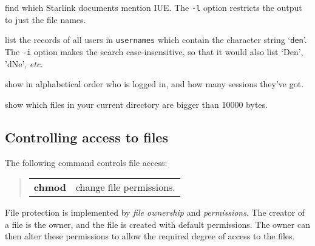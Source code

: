 {find which Starlink documents mention IUE.
The {\tt -l} option restricts the output to just the file names.}

{list the records of all users in {\tt usernames} which contain the character
string `{\tt den}'.
The {\tt -i} option makes the search case-insensitive, so that it would also
list `Den', 'dNe', {\em etc.}}

{show in alphabetical order who is logged in, and how many sessions they've
got.}

{show which files in your current directory are bigger than 10000 bytes.}

\exend

\subsection{Controlling access to files}

The following command controls file access:

\begin{quote}
\begin{tabular}{lp{72mm}}

{\bf chmod}  & change file permissions.

\end{tabular}
\end{quote}


File protection is implemented by {\em file ownership}\/ and {\em permissions}.
The creator of a file is the owner, and the file is created with default
permissions.
The owner can then alter these permissions to allow the required degree of
access to the files.

